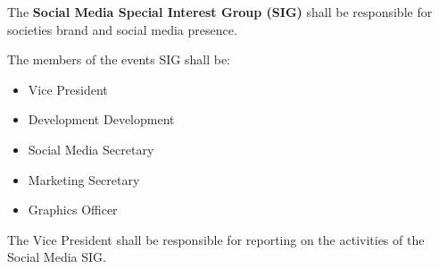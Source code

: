 \begin{clause}
    The \textbf{Social Media Special Interest Group (SIG)} shall be responsible for societies brand and social media presence.
\end{clause}

\begin{subclause}
    The members of the events SIG shall be:
    \begin{itemize}[label=--,topsep=0em,itemsep=0em]
        \item Vice President
        \item Development Development
        \item Social Media Secretary
        \item Marketing Secretary
        \item Graphics Officer
    \end{itemize}
\end{subclause}

\begin{subclause}
    The Vice President shall be responsible for reporting on the activities of the Social Media SIG.
\end{subclause}